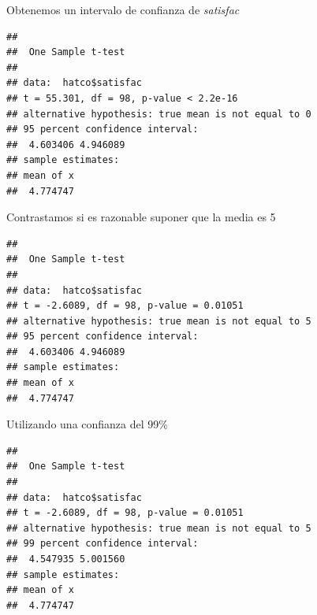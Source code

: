 \documentclass[
]{book}
\newenvironment{Shaded}{\begin{snugshade}}{\end{snugshade}}
\newcommand{\AttributeTok}[1]{\textcolor[rgb]{0.77,0.63,0.00}{#1}}
\newcommand{\CommentTok}[1]{\textcolor[rgb]{0.56,0.35,0.01}{\textit{#1}}}
\newcommand{\DecValTok}[1]{\textcolor[rgb]{0.00,0.00,0.81}{#1}}
\newcommand{\FloatTok}[1]{\textcolor[rgb]{0.00,0.00,0.81}{#1}}
\newcommand{\FunctionTok}[1]{\textcolor[rgb]{0.00,0.00,0.00}{#1}}
\newcommand{\NormalTok}[1]{#1}
\newcommand{\SpecialCharTok}[1]{\textcolor[rgb]{0.00,0.00,0.00}{#1}}
\theoremstyle{break}
\theoremstyle{nonumberplain}
\begin{document}
Obtenemos un intervalo de confianza de \emph{satisfac}

\begin{Shaded}
\end{Shaded}

\begin{verbatim}
## 
##  One Sample t-test
## 
## data:  hatco$satisfac
## t = 55.301, df = 98, p-value < 2.2e-16
## alternative hypothesis: true mean is not equal to 0
## 95 percent confidence interval:
##  4.603406 4.946089
## sample estimates:
## mean of x 
##  4.774747
\end{verbatim}

Contrastamos si es razonable suponer que la media es 5

\begin{Shaded}
\end{Shaded}

\begin{verbatim}
## 
##  One Sample t-test
## 
## data:  hatco$satisfac
## t = -2.6089, df = 98, p-value = 0.01051
## alternative hypothesis: true mean is not equal to 5
## 95 percent confidence interval:
##  4.603406 4.946089
## sample estimates:
## mean of x 
##  4.774747
\end{verbatim}

Utilizando una confianza del 99\%

\begin{Shaded}
\end{Shaded}

\begin{verbatim}
## 
##  One Sample t-test
## 
## data:  hatco$satisfac
## t = -2.6089, df = 98, p-value = 0.01051
## alternative hypothesis: true mean is not equal to 5
## 99 percent confidence interval:
##  4.547935 5.001560
## sample estimates:
## mean of x 
##  4.774747
\end{verbatim}
\end{document}

